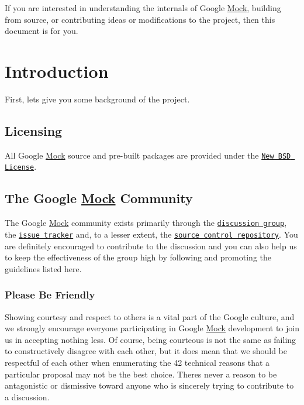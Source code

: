 If you are interested in understanding the internals of Google \hyperlink{class_mock}{Mock}, building from source, or contributing ideas or modifications to the project, then this document is for you.

\section*{Introduction}

First, let\textquotesingle{}s give you some background of the project.

\subsection*{Licensing}

All Google \hyperlink{class_mock}{Mock} source and pre-\/built packages are provided under the \href{http://www.opensource.org/licenses/bsd-license.php}{\tt New B\+SD License}.

\subsection*{The Google \hyperlink{class_mock}{Mock} Community}

The Google \hyperlink{class_mock}{Mock} community exists primarily through the \href{http://groups.google.com/group/googlemock}{\tt discussion group}, the \href{https://github.com/google/googletest/issues}{\tt issue tracker} and, to a lesser extent, the \href{../}{\tt source control repository}. You are definitely encouraged to contribute to the discussion and you can also help us to keep the effectiveness of the group high by following and promoting the guidelines listed here.

\subsubsection*{Please Be Friendly}

Showing courtesy and respect to others is a vital part of the Google culture, and we strongly encourage everyone participating in Google \hyperlink{class_mock}{Mock} development to join us in accepting nothing less. Of course, being courteous is not the same as failing to constructively disagree with each other, but it does mean that we should be respectful of each other when enumerating the 42 technical reasons that a particular proposal may not be the best choice. There\textquotesingle{}s never a reason to be antagonistic or dismissive toward anyone who is sincerely trying to contribute to a discussion.


